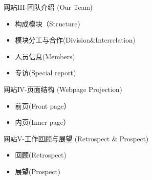 \documentclass{beamer}
\begin{document}
\begin{CJK*}{UTF8}{song}
\begin{frame}{网站III-团队介绍 (Our Team)}
\begin{itemize}
  \item 构成模块（Structure)
  \item 模块分工与合作(Division\&Interrelation)
  \item 人员信息(Members)
  \item 专访(Special report)
\end{itemize}
\end{frame}

\begin{frame}{网站IV-页面结构 (Webpage Projection)}
\begin{itemize}
  \item 前页(Front page）
  \item 内页(Inner page）
\end{itemize}
\end{frame}

\begin{frame}{网站V-工作回顾与展望 (Retrospect \& Prospect)}
\begin{itemize}
  \item 回顾(Retrospect)
  \item 展望(Prospect)
\end{itemize}
\end{frame}

\end{CJK*}
\end{document}

